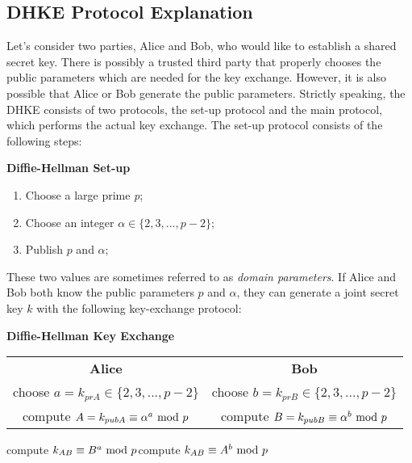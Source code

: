 \subsection{DHKE Protocol Explanation}
Let's consider two parties, Alice and Bob, who would like to establish a shared secret key. There is possibly a trusted third party that properly chooses the public parameters which are needed for the key exchange. However, it is also possible that Alice or Bob generate the public parameters. Strictly speaking, the DHKE consists of two protocols, the set-up protocol and the main protocol, which performs the actual key exchange. The set-up protocol consists of the following steps:
\begin{framed}
    \hfill\break\textbf{Diffie-Hellman Set-up}
    \begin{enumerate}
        \item Choose a large prime \textit{p};
        \item Choose an integer $\alpha\in\{2,3,...,p-2\}$;
        \item Publish $p$ and $\alpha$;
    \end{enumerate}
\end{framed}
These two values are sometimes referred to as \textit{domain parameters}. If Alice and Bob both know the public parameters $p$ and $\alpha$, they can generate a joint secret key $k$ with the following key-exchange protocol:
\begin{framed}
    \hfill\break\textbf{Diffie-Hellman Key Exchange}
    \begin{center}
        \begin{tabular}{c@{\hskip 3cm}c}
            \textbf{Alice}&\textbf{Bob}\\
            choose $a=k_{prA}\in\{2,3,...,p-2\}$&choose $b=k_{prB}\in\{2,3,...,p-2\}$\\
            compute $A=k_{pubA}\equiv\alpha^a\text{ mod } p$&compute $B=k_{pubB}\equiv\alpha^b\text{ mod } p$
        \end{tabular}
    \end{center}
    \hspace{2cm}compute $k_{AB}\equiv B^a\text{ mod } p$\hspace{4.25cm}compute $k_{AB}\equiv A^b\text{ mod } p$
\end{framed}
